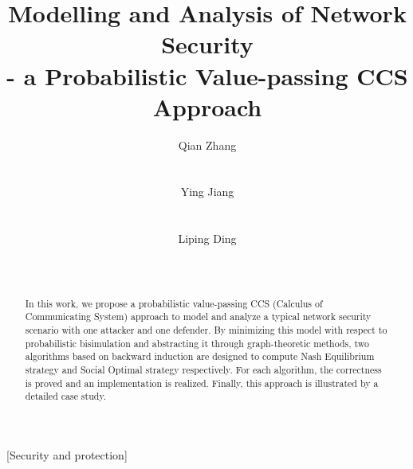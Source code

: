 \documentclass{acm_proc_article-sp}
\begin{document}
\title{Modelling and Analysis of Network Security\\- a Probabilistic Value-passing CCS Approach}

\author{
\alignauthor Qian Zhang\\
       \\
       \\
\alignauthor Ying Jiang\\
       \\
       \\
\alignauthor Liping Ding\\
       \\
       \\
       }
\maketitle

\begin{abstract}
In this work, we propose a probabilistic value-passing CCS (Calculus of Communicating System) approach to model and analyze a typical network security scenario with one attacker and one defender.
By minimizing this model with respect to probabilistic bisimulation and abstracting it through graph-theoretic methods,
two algorithms based on backward induction are designed to compute Nash Equilibrium strategy and Social Optimal strategy respectively. For each algorithm,
the correctness  is proved and an implementation is realized.
Finally, this approach is illustrated by a detailed case study.
\end{abstract}

[Security and protection]

\end{document}
